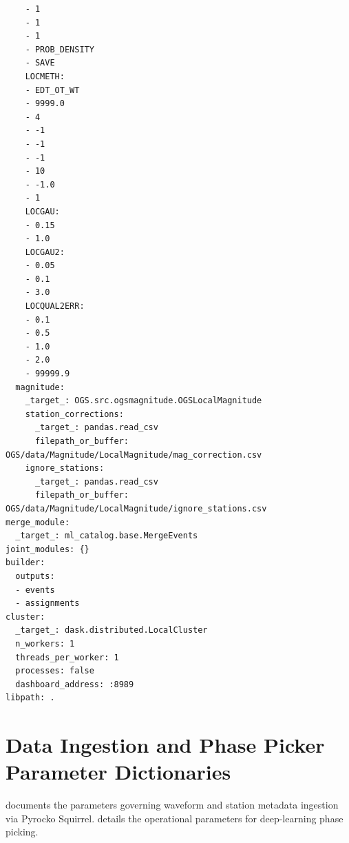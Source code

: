 \begin{lstlisting}
    - 1
    - 1
    - 1
    - PROB_DENSITY
    - SAVE
    LOCMETH:
    - EDT_OT_WT
    - 9999.0
    - 4
    - -1
    - -1
    - -1
    - 10
    - -1.0
    - 1
    LOCGAU:
    - 0.15
    - 1.0
    LOCGAU2:
    - 0.05
    - 0.1
    - 3.0
    LOCQUAL2ERR:
    - 0.1
    - 0.5
    - 1.0
    - 2.0
    - 99999.9
  magnitude:
    _target_: OGS.src.ogsmagnitude.OGSLocalMagnitude
    station_corrections:
      _target_: pandas.read_csv
      filepath_or_buffer: OGS/data/Magnitude/LocalMagnitude/mag_correction.csv
    ignore_stations:
      _target_: pandas.read_csv
      filepath_or_buffer: OGS/data/Magnitude/LocalMagnitude/ignore_stations.csv
merge_module:
  _target_: ml_catalog.base.MergeEvents
joint_modules: {}
builder:
  outputs:
  - events
  - assignments
cluster:
  _target_: dask.distributed.LocalCluster
  n_workers: 1
  threads_per_worker: 1
  processes: false
  dashboard_address: :8989
libpath: .
\end{lstlisting}

\section{Data Ingestion and Phase Picker Parameter Dictionaries}
\label{sec:app_data_params}

 documents the parameters
governing waveform and station metadata ingestion via Pyrocko
Squirrel.  details the
operational parameters for deep-learning phase picking.

